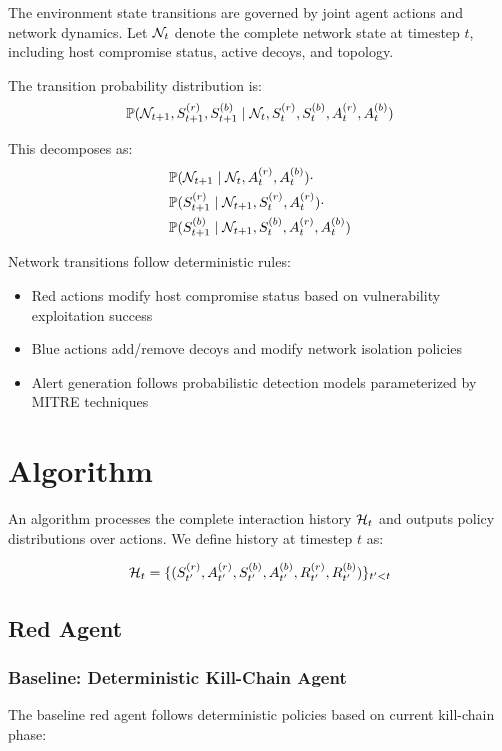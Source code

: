 \documentclass[12pt,twoside]{article}
\begin{document}
The environment state transitions are governed by joint agent actions and network dynamics. Let $\mathcal{N}_t$ denote the complete network state at timestep $t$, including host compromise status, active decoys, and topology.

The transition probability distribution is:
\begin{equation}
\mathbb{P}(\mathcal{N}_{t+1}, S_{t+1}^{(r)}, S_{t+1}^{(b)} \mid \mathcal{N}_t, S_t^{(r)}, S_t^{(b)}, A_t^{(r)}, A_t^{(b)})
\end{equation}

This decomposes as:
\begin{align}
&\mathbb{P}(\mathcal{N}_{t+1} \mid \mathcal{N}_t, A_t^{(r)}, A_t^{(b)}) \cdot \\
&\mathbb{P}(S_{t+1}^{(r)} \mid \mathcal{N}_{t+1}, S_t^{(r)}, A_t^{(r)}) \cdot \\
&\mathbb{P}(S_{t+1}^{(b)} \mid \mathcal{N}_{t+1}, S_t^{(b)}, A_t^{(r)}, A_t^{(b)})
\end{align}

Network transitions follow deterministic rules:
\begin{itemize}
    \item Red actions modify host compromise status based on vulnerability exploitation success
    \item Blue actions add/remove decoys and modify network isolation policies
    \item Alert generation follows probabilistic detection models parameterized by MITRE techniques
\end{itemize}

\section{Algorithm}

An algorithm processes the complete interaction history $\mathcal{H}_t$ and outputs policy distributions over actions. We define history at timestep $t$ as:

\begin{equation}
\mathcal{H}_t = \{(S_{t'}^{(r)}, A_{t'}^{(r)}, S_{t'}^{(b)}, A_{t'}^{(b)}, R_{t'}^{(r)}, R_{t'}^{(b)})\}_{t' < t}
\end{equation}

\subsection{Red Agent}

\subsubsection{Baseline: Deterministic Kill-Chain Agent}
The baseline red agent follows deterministic policies based on current kill-chain phase:
\end{document}
